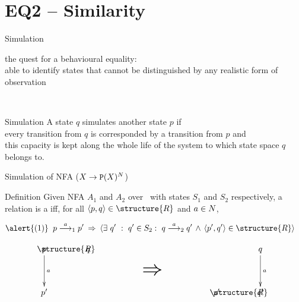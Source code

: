 \documentclass[aspectratio=169]{beamer}
\newcommand{\gold}[1]{\textcolor{darkgoldenrod}{#1}\xspace}
\begin{document}
\section{EQ2 -- Similarity}

\begin{slide}{Simulation}
\begin{flushright}
the quest for a \alert{behavioural equality}:\\
able to identify states that cannot be distinguished by any \alert{realistic} form of  observation
\end{flushright}
~\\

\small
\begin{block}{Simulation}
{A state $q$ \alert{simulates} another state $p$
\alert{if}\\
every transition from $q$ is corresponded by a transition from $p$
\alert{and}\\
this capacity is kept along the whole life of the system to which state space $q$ belongs to.}
\end{block}
\end{slide}

\begin{slide}{Simulation of NFA ($X \to \mathtt{P}(X)^{N}$)}
\small

\begin{block}{Definition}
Given NFA $A_1$ and $A_2$ over \Act\ with states $S_1$ and $S_2$ respectively,
a relation  is a  iff,
for all $\pair{p,q} \in \structure{R}$ and $a \in N$,

\begin{align*}
\text{\alert{(1)}}\; \;  & p \rtran{a}_1 p'\;  \imp\; \rcb{\exists}{q'}{q' \in S_2}{q \rtran{a}_2 q'\, \land\, \pair{p',q'} \in \structure{R}}   
\end{align*}
\vspace{0mm}

\begin{equation*}
\xymatrix{
p \ar[d]^-{a} & \hspace{-1.5cm} \structure{R}  & \hspace{-2.7cm} q 
  & \!\! \text{\raisebox{-10mm}{\Huge $\imp$}} \! \! &  &  &  q \ar[d]^-{a} \\
p'           &   &           &                                   & p'\hspace{-2.7cm} &  \structure{R} \hspace{-1.5cm} &  q'
}
\end{equation*}

\end{block}
\end{slide}
\end{document}
